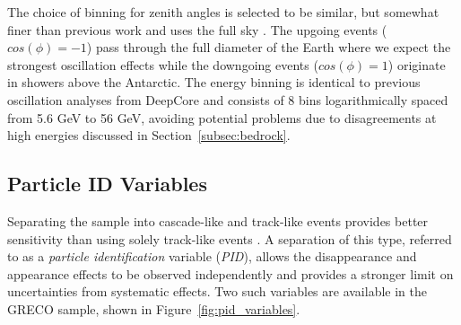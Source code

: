 The choice of binning for zenith angles is selected to be similar, but somewhat finer than previous work and uses the full sky \cite{IceCube-Oscillation2013,IceCube-Oscillation2015,IceCube-Oscillation2018}.
The upgoing events (${cos(\phi)}=-1$) pass through the full diameter of the Earth where we expect the strongest oscillation effects while the downgoing events (${cos(\phi)}=1$) originate in showers above the Antarctic.
The energy binning is identical to previous oscillation analyses from DeepCore and consists of 8 bins logarithmically spaced from 5.6 GeV to 56 GeV, avoiding potential problems due to disagreements at high energies discussed in Section~\ref{subsec:bedrock}.

\label{sec:pid_variables}
\subsection{Particle ID Variables}
Separating the sample into cascade-like and track-like events provides better sensitivity than using solely track-like events \cite{IceCube-Oscillation2015,IceCube-Oscillation2018,IceCubeSterile-Andrii,SuperK-Tau2017}.
A separation of this type, referred to as a \emph{particle identification} variable (\emph{PID}), allows the disappearance and appearance effects to be observed independently and provides a stronger limit on uncertainties from systematic effects.
Two such variables are available in the GRECO sample, shown in Figure~\ref{fig:pid_variables}.

